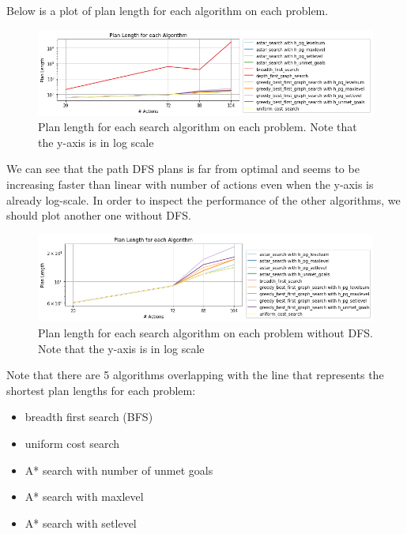\documentclass{article}[12pt]
\begin{document}
			Below is a plot of plan length for each algorithm on each problem.\\
			
			\begin{figure}[h!]
				\includegraphics[width=\linewidth]{plan_length.png}
				\caption{Plan length for each search algorithm on each problem. Note that the y-axis is in log scale}
				\label{fig:plan_length}
			\end{figure}
		
			We can see that the path DFS plans is far from optimal and seems to be increasing faster than linear with number of actions even when the y-axis is already log-scale. In order to inspect the performance of the other algorithms, we should plot another one without DFS.
			
			\newpage
			\begin{figure}[h!]
				\includegraphics[width=\linewidth]{plan_length_no_dfs.png}
				\caption{Plan length for each search algorithm on each problem without DFS. Note that the y-axis is in log scale}
				\label{fig:plan_length_no_dfs}
			\end{figure}
		
			Note that there are 5 algorithms overlapping with the line that represents the shortest plan lengths for each problem:
			\begin{itemize}
				\item breadth first search (BFS)
				\item uniform cost search
				\item A* search with number of unmet goals
				\item A* search with maxlevel
				\item A* search with setlevel
			\end{itemize}
			
\end{document}
